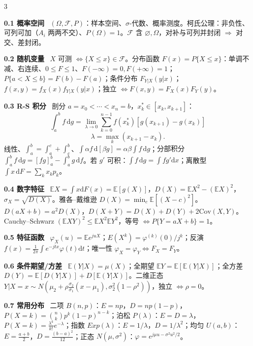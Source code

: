 \documentclass[UTF8,a4paper]{ctexart}
\newcommand{\Sec}[1]{\par\vspace{1.4pt}{\bfseries\color{blue!65!black}\small #1}\par\vspace{0.4pt}}
\newcommand{\T}[1]{{\bfseries #1}\ }
\newcommand{\Hi}[1]{\textcolor{red!70!black}{#1}}
\newcommand{\dd}{\mathrm{d}}
\newcommand{\E}{\mathbb{E}}
\newcommand{\Cov}{\mathrm{Cov}}
\begin{document}
\fontsize{8.7}{9.8}\selectfont
\setlength{\abovedisplayskip}{1.5pt plus 0.8pt minus 0.8pt}
\setlength{\belowdisplayskip}{1.5pt plus 0.8pt minus 0.8pt}
\setlength{\abovedisplayshortskip}{1pt plus 0.5pt minus 0.5pt}
\setlength{\belowdisplayshortskip}{1.5pt plus 0.8pt minus 0.8pt}
\setlength{\jot}{0.5pt}
\raggedcolumns
\begin{multicols}{3}

\Sec{第0章 预备知识}

\T{0.1 概率空间} $(\Omega,\mathcal F,P)$：样本空间、$\sigma$-代数、概率测度。柯氏公理：非负性、可列可加（$A_i$ 两两不交）、$P(\Omega)=1$。$\mathcal F$ 含 $\varnothing,\Omega$，对补与可列并封闭 $\Rightarrow$ 对交、差封闭。

\T{0.2 随机变量} $X$ 可测 $\iff\{X\le x\}\in\mathcal F$。分布函数 $F(x)=P\{X\le x\}$：单调不减、右连续、$0\le F\le1$、$F(-\infty)=0,F(+\infty)=1$；$P\{a<X\le b\}=F(b)-F(a)$；条件分布 $F_{Y|X}(y|x)$；$f(x,y)=f_X(x)f_{Y|X}(y|x)$；独立 $\iff F(x,y)=F_X(x)F_Y(y)$。

\T{0.3 R-S 积分} 剖分 $a=x_0<\cdots<x_n=b$，$x_k^*\in[x_k,x_{k+1}]$：
$$\int_a^bf\,\dd g=\lim_{\lambda\to0}\sum_{k=0}^{n-1}f(x_k^*)[g(x_{k+1})-g(x_k)]$$$$\lambda=\max_k(x_{k+1}-x_k).$$
线性、$\int_a^b=\int_a^c+\int_c^b$、$\int\alpha f\,\dd[\beta g]=\alpha\beta\int f\,\dd g$；\Hi{分部积分 $\int_a^bf\,\dd g=[fg]_a^b-\int_a^bg\,\dd f$}。若 $g'$ 可积：$\int f\,\dd g=\int fg'\dd x$；离散型 $\int x\,\dd F=\sum_kx_kp_k$。

\T{0.4 数字特征} $\E X=\int x\dd F(x)=\E[g(X)]$，$D(X)=\E X^2-(\E X)^2$，$\sigma_X=\sqrt{D(X)}$。\Hi{雅各--戴维逊 $D(X)=\min_c\E[(X-c)^2]$}。$D(aX+b)=a^2D(X)$，$D(X+Y)=D(X)+D(Y)+2\Cov(X,Y)$。Cauchy--Schwarz $(\E XY)^2\le\E X^2\E Y^2$，等号 $\iff P\{Y=aX+b\}=1$。

\T{0.5 特征函数} $\varphi_X(u)=\E e^{juX}$；$E(X^k)=\varphi^{(k)}(0)/j^k$；\Hi{反演 $f(x)=\frac1{2\pi}\int e^{-jtx}\varphi(t)\dd t$}；唯一性 $\varphi_X=\varphi_Y\iff F_X=F_Y$。

\T{0.6 条件期望/方差} $\E(Y|X)=\mu(X)$；\Hi{全期望 $\E Y=\E[\E(Y|X)]$}；\Hi{全方差 $D(Y)=\E[D(Y|X)]+D[\E(Y|X)]$}。二维正态 $Y|X=x\sim N(\mu_2+\rho\frac{\sigma_2}{\sigma_1}(x-\mu_1),\sigma_2^2(1-\rho^2))$，独立 $\iff\rho=0$。

\T{0.7 常用分布} 二项 $B(n,p)$：$E=np$，$D=np(1-p)$，$P(X=k)=\binom nkp^k(1-p)^{n-k}$；泊松 $P(\lambda)$：$E=D=\lambda$，$P(X=k)=\frac{\lambda^k}{k!}e^{-\lambda}$；指数 $Exp(\lambda)$：$E=1/\lambda$，$D=1/\lambda^2$；均匀 $U(a,b)$：$E=\frac{a+b}2$，$D=\frac{(b-a)^2}{12}$；正态 $N(\mu,\sigma^2)$：$\varphi=e^{j\mu u-\sigma^2u^2/2}$。


\end{multicols}
\end{document}
